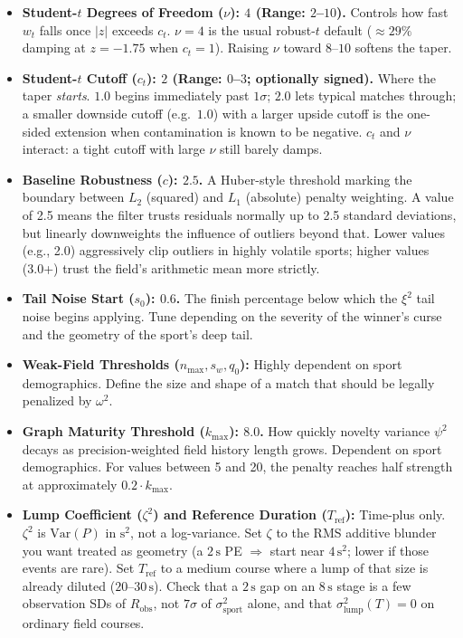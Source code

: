\documentclass[12pt]{article}
\newcommand{\ssport}{\sigma_{\mathrm{sport}}^2}      %
\newcommand{\zetai}{\zeta^2}                    %
\newcommand{\slump}{\sigma_{\mathrm{lump}}^2}  %
\newcommand{\tref}{T_{\mathrm{ref}}}
\newcommand{\nudof}{\nu}       %
\newcommand{\ctcut}{c_t}       %
\begin{document}
\begin{itemize}
		\item \textbf{Student-$t$ Degrees of Freedom ($\nudof$): $4$ (Range: $2$--$10$).}
		Controls how fast \(w_t\) falls once \(|z|\) exceeds \(\ctcut\). \(\nudof = 4\) is the usual robust-$t$ default (\(\approx 29\%\) damping at \(z = -1.75\) when \(\ctcut = 1\)). Raising \(\nudof\) toward \(8\)--$10$ softens the taper.
		\item \textbf{Student-$t$ Cutoff ($\ctcut$): $2$ (Range: $0$--$3$; optionally signed).}
		Where the taper \emph{starts}. \(1.0\) begins immediately past \(1\sigma\); \(2.0\) lets typical matches through; a smaller downside cutoff (e.g.\ \(1.0\)) with a larger upside cutoff is the one-sided extension when contamination is known to be negative. \(\ctcut\) and \(\nudof\) interact: a tight cutoff with large \(\nudof\) still barely damps.
		\item \textbf{Baseline Robustness ($c$): $2.5$.}
		A Huber-style threshold marking the boundary between $L_2$ (squared) and $L_1$ (absolute) penalty weighting. A value of 2.5 means the filter trusts residuals normally up to 2.5 standard deviations, but linearly downweights the influence of outliers beyond that. Lower values (e.g., 2.0) aggressively clip outliers in highly volatile sports; higher values (3.0+) trust the field's arithmetic mean more strictly.
		\item \textbf{Tail Noise Start ($s_0$): $0.6$.}
		The finish percentage below which the $\xi^2$ tail noise begins applying. Tune depending on the severity of the winner's curse and the geometry of the sport's deep tail.
		\item \textbf{Weak-Field Thresholds ($n_{\mathrm{max}}, s_w, q_0$):}
		Highly dependent on sport demographics. Define the size and shape of a match that should be legally penalized by $\omega^2$.
		\item \textbf{Graph Maturity Threshold ($k_\mathrm{max}$): $8.0$.}
		How quickly novelty variance $\psi^2$ decays as precision-weighted field history length grows. Dependent on sport demographics. For values between 5 and 20, the penalty reaches half strength at approximately $0.2 \cdot k_\mathrm{max}$.
		\item \textbf{Lump Coefficient ($\zetai$) and Reference Duration ($\tref$):}
		Time-plus only. $\zetai$ is $\mathrm{Var}(P)$ in $\mathrm{s}^2$, not a log-variance. Set $\zeta$ to the RMS additive blunder you want treated as geometry (a $2\,\mathrm{s}$ PE $\Rightarrow$ start near $4\,\mathrm{s}^2$; lower if those events are rare). Set $\tref$ to a medium course where a lump of that size is already diluted ($20$--$30\,\mathrm{s}$). Check that a $2\,\mathrm{s}$ gap on an $8\,\mathrm{s}$ stage is a few observation SDs of $R_{\mathrm{obs}}$, not $7\sigma$ of $\ssport$ alone, and that $\slump(T)=0$ on ordinary field courses.
	\end{itemize}

	
	
\end{document}

